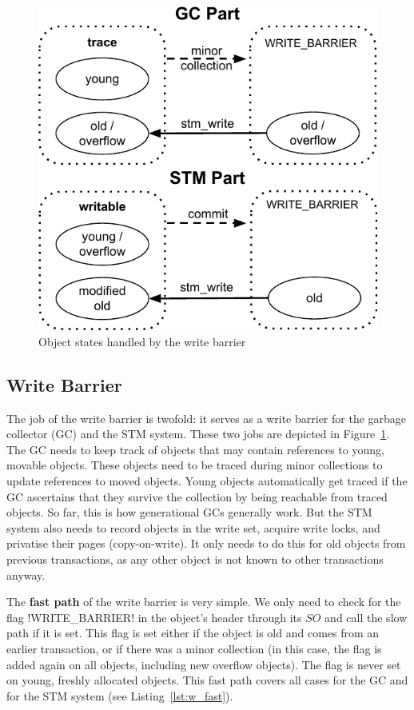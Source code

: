 \documentclass{sigplanconf}
\makeatletter
\renewcommand\lstinline[1][]{%
  \Collectverb{\@@myverb}%
}
\def\@@myverb#1{%
    \begingroup
    \fboxsep=0.2em
    \colorbox{verylightgray}{\oldlstinline|#1|}%
    \endgroup
}
\makeatother
\begin{document}
\begin{figure}[h]
  \centering
  \includegraphics[width=0.8\columnwidth]{object_states.pdf}
  \caption{Object states handled by the write barrier\label{fig:obj_states}}
\end{figure}


\subsection{Write Barrier}

The job of the write barrier is twofold: it serves as a write barrier
for the garbage collector (GC) and the STM system. These two jobs are
depicted in Figure~\ref{fig:obj_states}. The GC needs to keep track of
objects that may contain references to young, movable objects. These
objects need to be traced during minor collections to update
references to moved objects. Young objects automatically get traced if
the GC ascertains that they survive the collection by being reachable
from traced objects. So far, this is how generational GCs generally
work. But the STM system also needs to record objects in the
write set, acquire write locks, and privatise their pages
(copy-on-write). It only needs to do this for old objects from
previous transactions, as any other object is not known to other
transactions anyway.

The \textbf{fast path} of the write barrier is very simple. We only
need to check for the flag \lstinline!WRITE_BARRIER! in the object's
header through its $SO$ and call the slow path if it is set. This flag
is set either if the object is old and comes from an earlier
transaction, or if there was a minor collection (in this case, the flag
is added again on all objects, including new overflow objects). The flag
is never set on young, freshly allocated objects. This fast path
covers all cases for the GC and for the STM system (see
Listing~\ref{lst:w_fast}).
\end{document}
